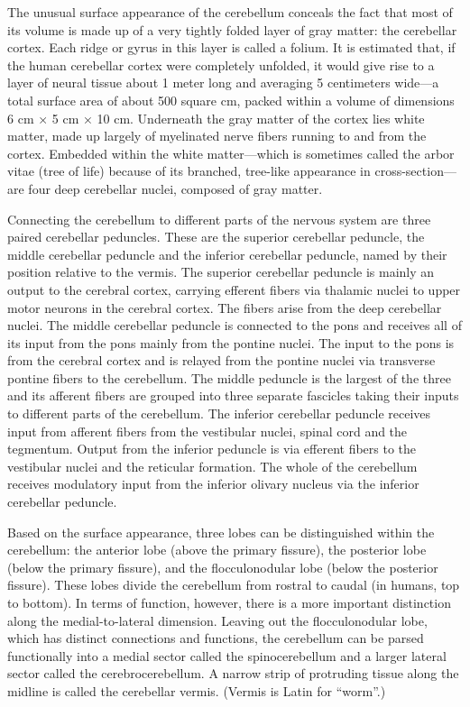 \documentclass[]{book}
\begin{document}
The unusual surface appearance of the cerebellum conceals the fact that most of its volume is made up of a very tightly folded layer of gray matter: the cerebellar cortex. Each ridge or gyrus in this layer is called a folium. It is estimated that, if the human cerebellar cortex were completely unfolded, it would give rise to a layer of neural tissue about 1 meter long and averaging 5 centimeters wide---a total surface area of about 500 square cm, packed within a volume of dimensions 6 cm × 5 cm × 10 cm. Underneath the gray matter of the cortex lies white matter, made up largely of myelinated nerve fibers running to and from the cortex. Embedded within the white matter---which is sometimes called the arbor vitae (tree of life) because of its branched, tree-like appearance in cross-section---are four deep cerebellar nuclei, composed of gray matter.

Connecting the cerebellum to different parts of the nervous system are three paired cerebellar peduncles. These are the superior cerebellar peduncle, the middle cerebellar peduncle and the inferior cerebellar peduncle, named by their position relative to the vermis. The superior cerebellar peduncle is mainly an output to the cerebral cortex, carrying efferent fibers via thalamic nuclei to upper motor neurons in the cerebral cortex. The fibers arise from the deep cerebellar nuclei. The middle cerebellar peduncle is connected to the pons and receives all of its input from the pons mainly from the pontine nuclei. The input to the pons is from the cerebral cortex and is relayed from the pontine nuclei via transverse pontine fibers to the cerebellum. The middle peduncle is the largest of the three and its afferent fibers are grouped into three separate fascicles taking their inputs to different parts of the cerebellum. The inferior cerebellar peduncle receives input from afferent fibers from the vestibular nuclei, spinal cord and the tegmentum. Output from the inferior peduncle is via efferent fibers to the vestibular nuclei and the reticular formation. The whole of the cerebellum receives modulatory input from the inferior olivary nucleus via the inferior cerebellar peduncle.

Based on the surface appearance, three lobes can be distinguished within the cerebellum: the anterior lobe (above the primary fissure), the posterior lobe (below the primary fissure), and the flocculonodular lobe (below the posterior fissure). These lobes divide the cerebellum from rostral to caudal (in humans, top to bottom). In terms of function, however, there is a more important distinction along the medial-to-lateral dimension. Leaving out the flocculonodular lobe, which has distinct connections and functions, the cerebellum can be parsed functionally into a medial sector called the spinocerebellum and a larger lateral sector called the cerebrocerebellum. A narrow strip of protruding tissue along the midline is called the cerebellar vermis. (Vermis is Latin for ``worm''.)
\end{document}
